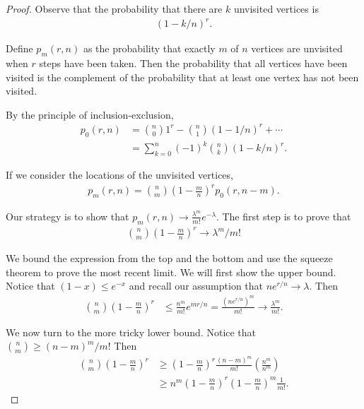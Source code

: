 \documentclass[12pt]{article}
\theoremstyle{definition}
\begin{document}
\begin{proof}
Observe that the probability that there are $k$ unvisited vertices is
\begin{align}
(1-k/n)^r \nonumber.
\end{align}

Define $p_m(r,n)$ as the probability that exactly $m$ of $n$ vertices are unvisited
when $r$ steps have been taken.
Then the probability that all vertices have been visited is the complement
of the probability that at least one vertex has not been visited.

By the principle of inclusion-exclusion,
\begin{align}
p_0(r,n) &= {n \choose 0} 1^r - {n \choose 1} (1-1/n)^r + \cdots \nonumber\\
&= \sum_{k=0}^n (-1)^k {n \choose k} (1-k/n)^r. \label{eqn:p0}
\end{align}

If we consider the locations of the unvisited vertices,
\begin{align}
p_m(r,n) = {n \choose m} \left(1-\frac{m}{n}\right)^r p_0(r, n-m). \nonumber
\end{align}

Our strategy is to show that $p_m(r,n) \rightarrow \frac{\lambda^m}{m!}e^{-\lambda}$.
The first step is to prove that
\begin{align}
{n \choose m} \left(1-\frac{m}{n}\right)^r \rightarrow \lambda ^m /m! \label{eqn:lim}
\end{align}

We bound the expression from the top and the bottom and use the squeeze
theorem to prove the most recent limit.
We will first show the upper bound.
Notice that $(1-x) \leq e^{-x}$ and recall our assumption that
$ne^{r/n} \rightarrow \lambda$.
Then
\begin{align}
{n \choose m} \left(1-\frac{m}{n}\right)^r &\leq \frac{n^m}{m!} e^{mr/n} 
= \frac{(n e^{r/n})^m} {m!}
\rightarrow \frac{\lambda ^m} {m!}. \label{eqn:up_lim}
\end{align}

We now turn to the more tricky lower bound.
Notice that ${n \choose m} \geq (n-m)^m / m!$
Then
\begin{align}
{n \choose m} \left(1-\frac{m}{n}\right)^r
&\geq \left(1-\frac{m}{n}\right)^r \frac{(n-m)^m}{m!}
\left( \frac{n^m}{n^m} \right) \nonumber\\
&\geq n^m (1 - \frac{m}{n})^r (1- \frac{m}{n})^m  \frac{1}{m!}. \nonumber
\end{align}


\end{proof}
\end{document}
